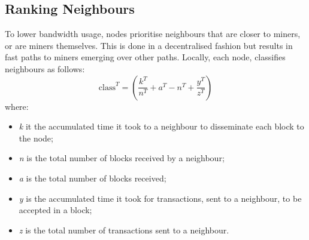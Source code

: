 \documentclass{dads}   %
\begin{document}



\subsection{Ranking Neighbours}
To lower bandwidth usage, nodes prioritise neighbours that are closer to miners, or are miners themselves.
This is done in a decentralised fashion but results in fast paths to miners emerging over other paths.
Locally, each node, classifies neighbours as follows:
\begin{displaymath} \mbox{class}^{T}= (\dfrac{k^{T}}{n^{T}} + a^{T} - n^{T} + \dfrac{y^{T}}{z^{T}}) \end{displaymath}
where:
\begin{itemize}
  \item \textit{k} it the accumulated time it took to a neighbour to disseminate each block to the node;
  \item \textit{n} is the total number of blocks received by a neighbour;
  \item \textit{a} is the total number of blocks received;
  \item \textit{y} is the accumulated time it took for transactions, sent to a neighbour, to be accepted in a block;
  \item \textit{z} is the total number of transactions sent to a neighbour.
\end{itemize}
\end{document}
